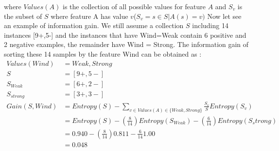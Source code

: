 where $Values(A)$ is the collection of all possible values for feature $A$ and $S_v$ is the subset of $S$ where feature A has value $v$($S_v={s\in S|A(s)=v})$
Now let see an example of information gain. We still assume a collection $S$ including 14 instances [9+,5-] and the instances that have Wind=Weak contain 6 positive and 2 negative examples, the remainder have Wind = Strong. The information gain of sorting these 14 samples by the feature Wind can be obtained as :
\begin{equation}
\begin{aligned}
Values(Wind)&=Weak,Strong\\
S&=[9+,5-]\\
S_{Weak}&=[6+,2-]\\
S_{strong}&=[3+,3-]\\
Gain(S,Wind)&=Entropy(S)-\sum_{v\in Values(A)\in\{Weak,Strong\}}\frac{S_v}{S}Entropy(S_v)\\
&=Entropy(S)-(\frac{8}{14})Entropy(S_{Weak})-(\frac{6}{14})Entropy(S_strong)\\
&=0.940 -(\frac{8}{14})0.811-\frac{6}{14}1.00\\
&=0.048
\end{aligned}
\end{equation}
